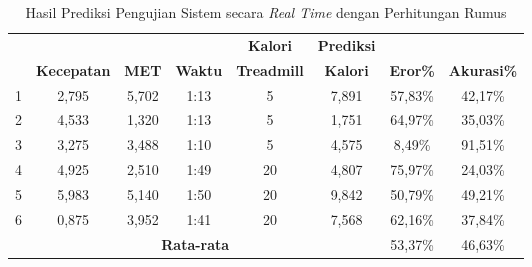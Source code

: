 \begin{longtable}{|c|c|c|c|c|c|c|c|}
  \caption{Hasil Prediksi Pengujian Sistem secara \emph{Real Time} dengan Perhitungan Rumus}
  \label{tb:PengujianRealTimeAnalisaPrediksiPerhitungan}                                   \\
  \hline
  \rowcolor[HTML]{C0C0C0}
  & & & & \textbf{Kalori} & \textbf{Prediksi} & & \\
  \rowcolor[HTML]{C0C0C0}
  \multirow{-2}{*}{\textbf{Percobaan}} & \multirow{-2}{*}{\textbf{Kecepatan}} & \multirow{-2}{*}{\textbf{MET}} & \multirow{-2}{*}{\textbf{Waktu}} & \textbf{Treadmill} & \textbf{Kalori} & \multirow{-2}{*}{\textbf{Eror\%}} & \multirow{-2}{*}{\textbf{Akurasi\%}} \\
  \hline
  1   & 2,795   & 5,702    & 1:13    & 5    & 7,891   & 57,83\%      & 42,17\%   \\
  \hline
  2   & 4,533   & 1,320    & 1:13    & 5    & 1,751   & 64,97\%      & 35,03\%   \\
  \hline
  3   & 3,275   & 3,488    & 1:10    & 5    & 4,575   & 8,49\%       & 91,51\%   \\
  \hline
  4   & 4,925   & 2,510    & 1:49    & 20   & 4,807   & 75,97\%      & 24,03\%   \\
  \hline
  5   & 5,983   & 5,140    & 1:50    & 20   & 9,842   & 50,79\%      & 49,21\%   \\
  \hline
  6   & 0,875   & 3,952    & 1:41    & 20   & 7,568   & 62,16\%      & 37,84\%   \\
  \hline

  \multicolumn{6}{|c|}{\textbf{Rata-rata}} & 53,37\% & 46,63\% \\
  \hline
\end{longtable}